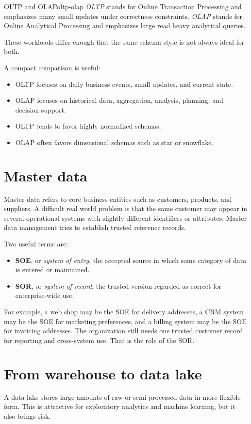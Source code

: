 \documentclass[11pt,a4paper,openany]{book}
\begin{document}
\begin{definition}{OLTP and OLAP}{oltp-olap}
\emph{OLTP} stands for Online Transaction Processing and emphasizes many small updates under correctness constraints. \emph{OLAP} stands for Online Analytical Processing and emphasizes large read heavy analytical queries.
\end{definition}

These workloads differ enough that the same schema style is not always ideal for both.

A compact comparison is useful:
\begin{itemize}
\item OLTP focuses on daily business events, small updates, and current state.
\item OLAP focuses on historical data, aggregation, analysis, planning, and decision support.
\item OLTP tends to favor highly normalized schemas.
\item OLAP often favors dimensional schemas such as star or snowflake.
\end{itemize}

\section{Master data}
Master data refers to core business entities such as customers, products, and suppliers. A difficult real world problem is that the same customer may appear in several operational systems with slightly different identifiers or attributes. Master data management tries to establish trusted reference records.

Two useful terms are:
\begin{itemize}
\item \textbf{SOE}, or \emph{system of entry}, the accepted source in which some category of data is entered or maintained.
\item \textbf{SOR}, or \emph{system of record}, the trusted version regarded as correct for enterprise-wide use.
\end{itemize}

For example, a web shop may be the SOE for delivery addresses, a CRM system may be the SOE for marketing preferences, and a billing system may be the SOE for invoicing addresses. The organization still needs one trusted customer record for reporting and cross-system use. That is the role of the SOR.

\section{From warehouse to data lake}
A data lake stores large amounts of raw or semi processed data in more flexible form. This is attractive for exploratory analytics and machine learning, but it also brings risk.
\end{document}
